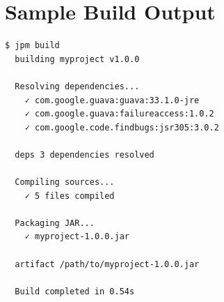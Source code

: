 \documentclass[12pt,a4paper]{report}
\begin{document}
\chapter{Sample Build Output}

\begin{lstlisting}[language=bash, caption=JPM Build Output]
$ jpm build
  building myproject v1.0.0
  
  Resolving dependencies...
    ✓ com.google.guava:guava:33.1.0-jre
    ✓ com.google.guava:failureaccess:1.0.2
    ✓ com.google.code.findbugs:jsr305:3.0.2
  
  deps 3 dependencies resolved
  
  Compiling sources...
    ✓ 5 files compiled
  
  Packaging JAR...
    ✓ myproject-1.0.0.jar
  
  artifact /path/to/myproject-1.0.0.jar
  
  Build completed in 0.54s
\end{lstlisting}
\end{document}
